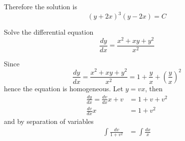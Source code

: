 Therefore the solution is
\[(y+2x)^3(y-2x)=C\]
\begin{problem}
    Solve the differential equation
    \[\frac{dy}{dx}=\frac{x^2+xy+y^2}{x^2}\]
\end{problem}
\begin{solution}
    Since
    \[\frac{dy}{dx}=\frac{x^2+xy+y^2}{x^2}
    =1+\frac{y}{x}+\left(\frac{y}{x}\right)^2\]
    hence the equation is homogeneous.
    Let \(y=vx\), then
    \begin{align*}
        \frac{dy}{dx}=\frac{dv}{dx}x+v &= 1+v+v^2 \\
        \frac{dv}{dx}x &= 1+v^2
    \end{align*}
    and by separation of variables
    \begin{align*}
        \int\frac{dv}{1+v^2} &= \int\frac{dx}{x}
    \end{align*}
\end{solution}

